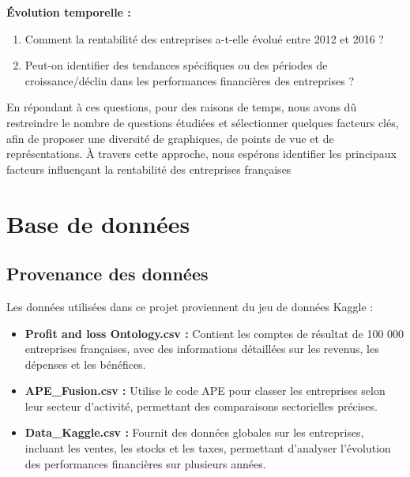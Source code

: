 \documentclass[mstat,12pt]{unswthesis}
\begin{document}
\textbf{Évolution temporelle :}

\begin{enumerate}
\def\labelenumi{\alph{enumi}.}
\item
  Comment la rentabilité des entreprises a-t-elle évolué entre 2012 et
  2016 ?
\item
  Peut-on identifier des tendances spécifiques ou des périodes de
  croissance/déclin dans les performances financières des entreprises ?
\end{enumerate}

\medskip

En répondant à ces questions, pour des raisons de temps, nous avons dû
restreindre le nombre de questions étudiées et sélectionner quelques
facteurs clés, afin de proposer une diversité de graphiques, de points
de vue et de représentations. À travers cette approche, nous espérons
identifier les principaux facteurs influençant la rentabilité des
entreprises françaises

\medskip

\chapter{Base de données}\label{base-de-donnuxe9es}

\section{Provenance des données}\label{provenance-des-donnuxe9es}

Les données utilisées dans ce projet proviennent du jeu de données
Kaggle : \medskip

\begin{itemize}[label=$\circ$]
  \item \textnormal{\textbf{Profit and loss \- Ontology.csv :} Contient les comptes de résultat de 100 000 entreprises françaises, avec des informations détaillées sur les revenus, les dépenses et les bénéfices.}
  
  \item \textnormal{\textbf{APE\_Fusion.csv :} Utilise le code APE pour classer les entreprises selon leur secteur d’activité, permettant des comparaisons sectorielles précises.}

  \item \textnormal{\textbf{Data\_Kaggle.csv :} Fournit des données globales sur les entreprises, incluant les ventes, les stocks et les taxes, permettant d'analyser l’évolution des performances financières sur plusieurs années.}
\end{itemize}
\end{document}
